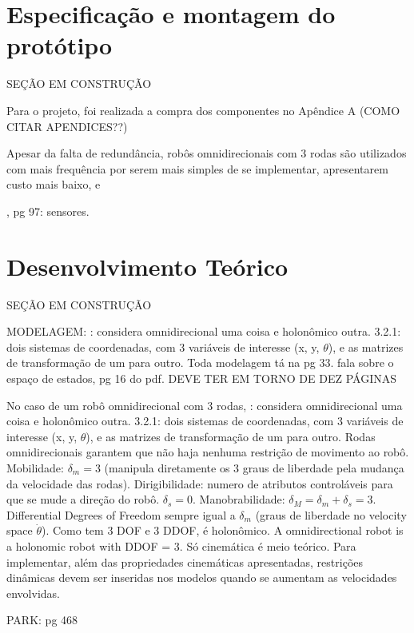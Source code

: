 \section{Especificação e montagem do protótipo}
\label{sec:montagem}

SEÇÃO EM CONSTRUÇÃO

Para o projeto, foi realizada a compra dos componentes no Apêndice A (COMO CITAR APENDICES??)

Apesar da falta de redundância, robôs omnidirecionais com 3 rodas são utilizados com mais frequência por serem mais simples de se implementar, apresentarem custo mais baixo, e

\cite{siegwart2011introduction}, pg 97: sensores.

\section{Desenvolvimento Teórico}
\label{sec:teorico}

SEÇÃO EM CONSTRUÇÃO

MODELAGEM: \cite{siegwart2011introduction}: considera omnidirecional uma coisa e holonômico outra. 3.2.1: dois sistemas de coordenadas, com 3 variáveis de interesse (x, y, $\theta$), e as matrizes de transformação de um para outro. Toda modelagem tá na pg 33.
\cite{spong2005robot} fala sobre o espaço de estados, pg 16 do pdf.
DEVE TER EM TORNO DE DEZ PÁGINAS


No caso de um robô omnidirecional com 3 rodas, \cite{siegwart2011introduction}: considera omnidirecional uma coisa e holonômico outra. 3.2.1: dois sistemas de coordenadas, com 3 variáveis de interesse (x, y, $\theta$), e as matrizes de transformação de um para outro. Rodas omnidirecionais garantem que não haja nenhuma restrição de movimento ao robô. Mobilidade: $\delta_m = 3$ (manipula diretamente os 3 graus de liberdade pela mudança da velocidade das rodas). Dirigibilidade: numero de atributos controláveis para que se mude a direção do robô. $\delta_s = 0$. Manobrabilidade: $\delta_M = \delta_m+\delta_s = 3$. Differential Degrees of Freedom sempre igual a $\delta_m$ (graus de liberdade no velocity space $\dot\theta$). Como tem 3 DOF e 3 DDOF, é holonômico. A omnidirectional robot is a holonomic robot with DDOF = 3. Só cinemática é meio teórico. Para implementar, além das propriedades cinemáticas apresentadas, restrições dinâmicas devem ser inseridas nos modelos quando se aumentam as velocidades envolvidas.

PARK: pg 468

